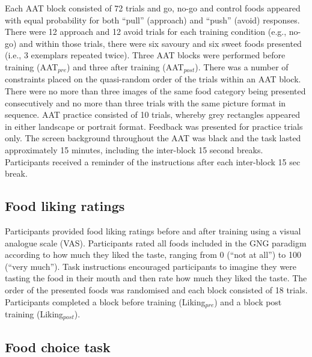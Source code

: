 \documentclass[man,floatsintext]{apa6}
\begin{document}
\par

Each AAT block consisted of 72 trials and go, no-go and control foods
appeared with equal probability for both \enquote{pull} (approach) and
\enquote{push} (avoid) responses. There were 12 approach and 12 avoid
trials for each training condition (e.g., no-go) and within those
trials, there were six savoury and six sweet foods presented (i.e., 3
exemplars repeated twice). Three AAT blocks were performed before
training (AAT\(_{pre}\)) and three after training (AAT\(_{post}\)).
There was a number of constraints placed on the quasi-random order of
the trials within an AAT block. There were no more than three images of
the same food category being presented consecutively and no more than
three trials with the same picture format in sequence. AAT practice
consisted of 10 trials, whereby grey rectangles appeared in either
landscape or portrait format. Feedback was presented for practice trials
only. The screen background throughout the AAT was black and the task
lasted approximately 15 minutes, including the inter-block 15 second
breaks. Participants received a reminder of the instructions after each
inter-block 15 sec break.

\subsection{Food liking ratings}\label{food_ratings}

\par

Participants provided food liking ratings before and after training
using a visual analogue scale (VAS). Participants rated all foods
included in the GNG paradigm according to how much they liked the taste,
ranging from 0 (\enquote{not at all}) to 100 (\enquote{very much}). Task
instructions encouraged participants to imagine they were tasting the
food in their mouth and then rate how much they liked the taste. The
order of the presented foods was randomised and each block consisted of
18 trials. Participants completed a block before training
(Liking\(_{pre}\)) and a block post training (Liking\(_{post}\)).

\subsection{Food choice task}\label{food_choice}
\end{document}
